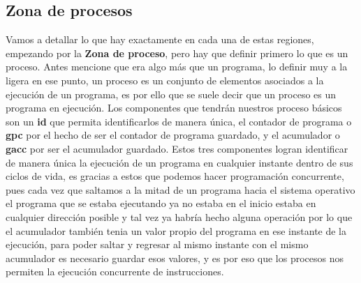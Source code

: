 \documentclass[12pt]{article}
\begin{document}
	\subsection{Zona de procesos}
	
	Vamos a detallar lo que hay exactamente en cada una de estas regiones, empezando por la \textbf{Zona de proceso}, pero
	hay que definir primero lo que es un proceso. Antes mencione que era algo más que un programa, lo definir muy a la ligera
	en ese punto, un proceso es un conjunto de elementos asociados a la ejecución de un programa, es por ello que se
	suele decir que un proceso es un programa en ejecución. Los componentes que tendrán nuestros proceso básicos son un
	\textbf{id} que permita identificarlos de manera única, el contador de programa o \textbf{gpc} por el hecho de ser el contador
	de programa guardado, y el acumulador o \textbf{gacc} por ser el acumulador guardado. Estos tres componentes logran identificar
	de manera única la ejecución de un programa en cualquier instante dentro de sus ciclos de vida, es gracias a estos que
	podemos hacer programación concurrente, pues cada vez que saltamos a la mitad de un programa hacia el sistema operativo 
	el programa que se estaba ejecutando ya no estaba en el inicio estaba en cualquier dirección posible y tal vez ya
	habría hecho alguna operación por lo que el acumulador también tenia un valor propio del programa en ese instante de la ejecución,
	para poder saltar y regresar al mismo instante con el mismo acumulador es necesario guardar esos valores, y es por eso que los
	procesos nos permiten la ejecución concurrente de instrucciones. 
	
\end{document}
